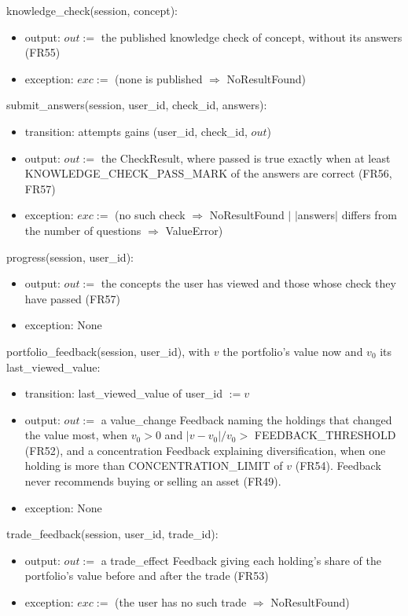 \documentclass[12pt, titlepage]{article}
\begin{document}
\noindent knowledge\_check(session, concept):
\begin{itemize}
\item output: $out :=$ the published knowledge check of concept, without its
  answers (FR55)
\item exception: $exc :=$ (none is published $\Rightarrow$ NoResultFound)
\end{itemize}

\noindent submit\_answers(session, user\_id, check\_id, answers):
\begin{itemize}
\item transition: attempts gains (user\_id, check\_id, $out$)
\item output: $out :=$ the CheckResult, where passed is true exactly when at
  least KNOWLEDGE\_CHECK\_PASS\_MARK of the answers are correct (FR56, FR57)
\item exception: $exc :=$ (no such check $\Rightarrow$ NoResultFound $|$
  $|$answers$|$ differs from the number of questions $\Rightarrow$ ValueError)
\end{itemize}

\noindent progress(session, user\_id):
\begin{itemize}
\item output: $out :=$ the concepts the user has viewed and those whose check
  they have passed (FR57)
\item exception: None
\end{itemize}

\noindent portfolio\_feedback(session, user\_id), with $v$ the portfolio's
value now and $v_0$ its last\_viewed\_value:
\begin{itemize}
\item transition: last\_viewed\_value of user\_id $:= v$
\item output: $out :=$ a value\_change Feedback naming the holdings that
  changed the value most, when $v_0 > 0$ and $|v - v_0| / v_0 >$
  FEEDBACK\_THRESHOLD (FR52), and a concentration Feedback explaining
  diversification, when one holding is more than CONCENTRATION\_LIMIT of $v$
  (FR54). Feedback never recommends buying or selling an asset (FR49).
\item exception: None
\end{itemize}

\noindent trade\_feedback(session, user\_id, trade\_id):
\begin{itemize}
\item output: $out :=$ a trade\_effect Feedback giving each holding's share of
  the portfolio's value before and after the trade (FR53)
\item exception: $exc :=$ (the user has no such trade $\Rightarrow$
  NoResultFound)
\end{itemize}
\end{document}
